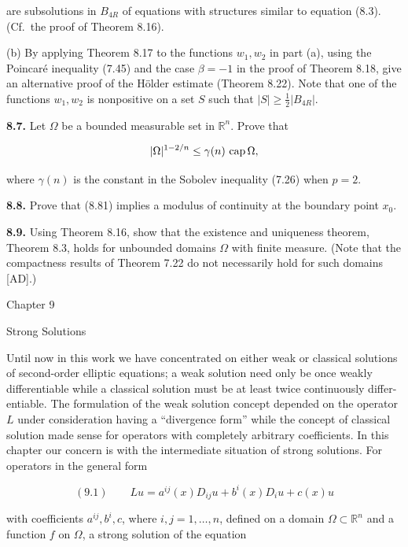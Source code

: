 
are subsolutions in $B_{4R}$ of equations with structures similar to equation (8.3). (Cf.\ the proof of Theorem 8.16).

(b) By applying Theorem 8.17 to the functions $w_1, w_2$ in part (a), using the Poincar\'e inequality (7.45) and the case $\beta=-1$ in the proof of Theorem 8.18, give an alternative proof of the H\"older estimate (Theorem 8.22). Note that one of the functions $w_1, w_2$ is nonpositive on a set $S$ such that $|S|\geq \frac{1}{2}|B_{4R}|$.

\bigskip

\noindent\textbf{8.7.} Let $\Omega$ be a bounded measurable set in $\mathbb{R}^n$. Prove that

\[
|\Omega|^{1-2/n}\leq \gamma(n)\,\operatorname{cap} \Omega,
\]

where $\gamma(n)$ is the constant in the Sobolev inequality (7.26) when $p=2$.

\bigskip

\noindent\textbf{8.8.} Prove that (8.81) implies a modulus of continuity at the boundary point $x_0$.

\bigskip

\noindent\textbf{8.9.} Using Theorem 8.16, show that the existence and uniqueness theorem, Theorem 8.3, holds for unbounded domains $\Omega$ with finite measure. (Note that the compactness results of Theorem 7.22 do not necessarily hold for such domains [AD].)



Chapter 9

Strong Solutions

Until now in this work we have concentrated on either weak or classical solutions
of second-order elliptic equations; a weak solution need only be once weakly
differentiable while a classical solution must be at least twice continuously differ-
entiable. The formulation of the weak solution concept depended on the operator
$L$ under consideration having a ``divergence form'' while the concept of classical
solution made sense for operators with completely arbitrary coefficients. In this
chapter our concern is with the intermediate situation of strong solutions. For
operators in the general form

\[
(9.1)\qquad Lu = a^{ij}(x)D_{ij}u + b^i(x)D_i u + c(x)u
\]

with coefficients $a^{ij}, b^i, c$, where $i, j = 1, \dots, n$, defined on a domain $\Omega \subset \mathbb{R}^n$ and a
function $f$ on $\Omega$, a strong solution of the equation

